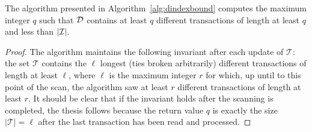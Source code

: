 \begin{lemma}\label{lem:algocorrect}
  The algorithm presented in Algorithm~\ref{alg:dindexbound} computes the maximum
  integer $q$ such that ${\cal D}$ contains at least $q$ different transactions of
  length at least $q$ and less than $|{\cal I}|$.
\end{lemma}

\begin{proof}
  The algorithm maintains the following invariant after each update of
  $\mathcal{T}$: the set $\mathcal{T}$ contains the $\ell$ longest (ties broken
  arbitrarily) different transactions of length at least $\ell$, where $\ell$ is
  the maximum integer $r$ for which, up until to this point of the scan, the
  algorithm saw at least $r$ different transactions of length at least $r$. It
  should be clear that if the invariant holds after the scanning is completed,
  the thesis follows because the return value $q$ is exactly the size
  $|\mathcal{T}|=\ell$ after the last transaction has been read and processed.
  

\end{proof}
